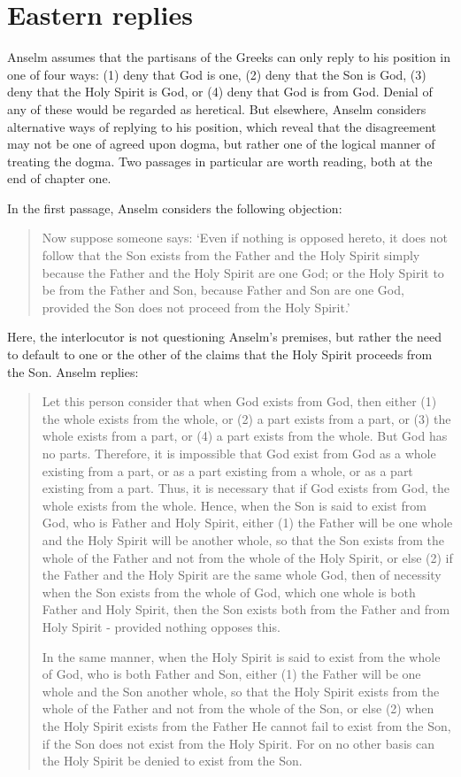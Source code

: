 \documentclass[]{article}
\begin{document}
\section{Eastern replies}
Anselm assumes that the partisans of the Greeks can only reply to his position in one of four ways: (1) deny that God is one, (2) deny that the Son is God, (3) deny that the Holy Spirit is God, or (4) deny that God is from God. Denial of any of these would be regarded as heretical. But elsewhere, Anselm considers alternative ways of replying to his position, which reveal that the disagreement may not be one of agreed upon dogma, but rather one of the logical manner of treating the dogma. Two passages in particular are worth reading, both at the end of chapter one. 

In the first passage, Anselm considers the following objection: 

\begin{quote}
	Now suppose someone says: `Even if nothing is opposed hereto, it does not follow that the Son exists from the Father and the Holy Spirit simply because the Father and the Holy Spirit are one God; or the Holy Spirit to be from the Father and Son, because Father and Son are one God, provided the Son does not proceed from the Holy Spirit.'\autocite[473, alt.]{AnselmDeProc}
\end{quote}

Here, the interlocutor is not questioning Anselm's premises, but rather the need to default to one or the other of the claims that the Holy Spirit proceeds from the Son. Anselm replies: 

\begin{quote}
Let this person consider that when God exists from God, then either (1) the whole exists from the whole, or (2) a part exists from a part, or (3) the whole exists from a part, or (4) a part exists from the whole. But God has no parts. Therefore, it is impossible that God exist from God as a whole existing from a part, or as a part existing from a whole, or as a part existing from a part. Thus, it is necessary that if God exists from God, the whole exists from the whole. Hence, when the Son is said to exist from God, who is Father and Holy Spirit, either (1) the Father will be one whole and the Holy Spirit will be another whole, so that the Son exists from the whole of the Father and not from the whole of the Holy Spirit, or else (2) if the Father and the Holy Spirit are the same whole God, then of necessity when the Son exists from the whole of God, which one whole is both Father and Holy Spirit, then the Son exists both from the Father and from Holy Spirit - provided nothing opposes this. 

In the same manner, when the Holy Spirit is said to exist from the whole of God, who is both Father and Son, either (1) the Father will be one whole and the Son another whole, so that the Holy Spirit exists from the whole of the Father and not from the whole of the Son, or else (2) when the Holy Spirit exists from the Father He cannot fail to exist from the Son, if the Son does not exist from the Holy Spirit. For on no other basis can the Holy Spirit be denied to exist from the Son.\autocite[473-474]{AnselmDeProc}
\end{quote}
\end{document}
